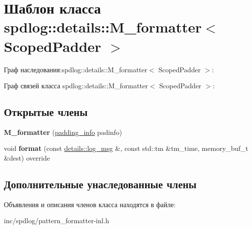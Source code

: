 \hypertarget{classspdlog_1_1details_1_1M__formatter}{}\section{Шаблон класса spdlog\+:\+:details\+:\+:M\+\_\+formatter$<$ Scoped\+Padder $>$}
\label{classspdlog_1_1details_1_1M__formatter}


Граф наследования\+:spdlog\+:\+:details\+:\+:M\+\_\+formatter$<$ Scoped\+Padder $>$\+:


Граф связей класса spdlog\+:\+:details\+:\+:M\+\_\+formatter$<$ Scoped\+Padder $>$\+:
\subsection*{Открытые члены}
\begin{DoxyCompactItemize}
\item 
\mbox{\label{classspdlog_1_1details_1_1M__formatter_a014b408b30c81a53b8093dbee4020656}} 
{\bfseries M\+\_\+formatter} (\hyperlink{structspdlog_1_1details_1_1padding__info}{padding\+\_\+info} padinfo)
\item 
\mbox{\label{classspdlog_1_1details_1_1M__formatter_afaefe35465d9a87029bd36865f9d33e7}} 
void {\bfseries format} (const \hyperlink{structspdlog_1_1details_1_1log__msg}{details\+::log\+\_\+msg} \&, const std\+::tm \&tm\+\_\+time, memory\+\_\+buf\+\_\+t \&dest) override
\end{DoxyCompactItemize}
\subsection*{Дополнительные унаследованные члены}


Объявления и описания членов класса находятся в файле\+:\begin{DoxyCompactItemize}
\item 
inc/spdlog/pattern\+\_\+formatter-\/inl.\+h\end{DoxyCompactItemize}

